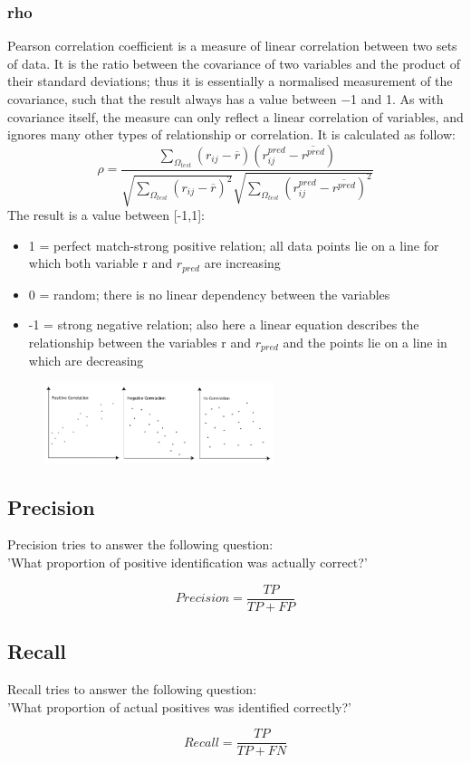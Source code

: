 \documentclass{article}
\begin{document}
\subsubsection{rho}
Pearson correlation coefficient is a measure of linear correlation between two sets of data. It is the ratio between the covariance of two variables and the product of their standard deviations; thus it is essentially a normalised measurement of the covariance, such that the result always has a value between −1 and 1. As with covariance itself, the measure can only reflect a linear correlation of variables, and ignores many other types of relationship or correlation.
It is calculated as follow:
\begin{equation}
      \rho = \frac{\sum_{\Omega_{test}} (r_{ij}-\overline{r})(r_{ij}^{pred}-\overline{r^{pred}})}{{\sqrt{\sum_{\Omega_{test}}(r_{ij}-\overline{r})^2}}{\sqrt{\sum_{\Omega_{test}}(r_{ij}^{pred}-\overline{r^{pred}})^2}}}
\end{equation}
The result is a value between [-1,1]:
\begin{itemize}
      \item 1 = perfect match-strong positive relation; all data points lie on a line for which both variable r and $r_{pred}$ are increasing
      \item 0 = random; there is no linear dependency between the variables
      \item -1 = strong negative relation; also here a linear equation describes the relationship between the variables r and $r_{pred}$ and the points lie on a line in which are decreasing
\end{itemize}
\begin{figure}[ht]
      \begin{center}
            \includegraphics[width=0.6\textwidth]{images/pearson.png}
      \end{center}
\end{figure}

\subsection{Precision}
Precision tries to answer the following question:\\
'What proportion of positive identification was actually correct?'

\begin{equation}
      Precision = \frac{TP}{TP + FP}
\end{equation}
\subsection{Recall}
Recall tries to answer the following question:\\
'What proportion of actual positives was identified correctly?'

\begin{equation}
      Recall = \frac{TP}{TP + FN}
\end{equation}
\end{document}
